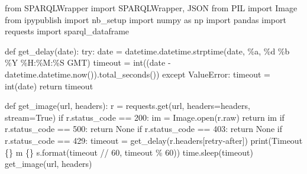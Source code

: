 \documentclass[
  letterpaper,
  DIV=11,
  numbers=noendperiod]{scrreprt}
\newenvironment{Shaded}{\begin{snugshade}}{\end{snugshade}}
\newcommand{\BuiltInTok}[1]{\textcolor[rgb]{0.00,0.23,0.31}{#1}}
\newcommand{\ControlFlowTok}[1]{\textcolor[rgb]{0.00,0.23,0.31}{#1}}
\newcommand{\DecValTok}[1]{\textcolor[rgb]{0.68,0.00,0.00}{#1}}
\newcommand{\ImportTok}[1]{\textcolor[rgb]{0.00,0.46,0.62}{#1}}
\newcommand{\KeywordTok}[1]{\textcolor[rgb]{0.00,0.23,0.31}{#1}}
\newcommand{\NormalTok}[1]{\textcolor[rgb]{0.00,0.23,0.31}{#1}}
\newcommand{\OperatorTok}[1]{\textcolor[rgb]{0.37,0.37,0.37}{#1}}
\newcommand{\PreprocessorTok}[1]{\textcolor[rgb]{0.68,0.00,0.00}{#1}}
\newcommand{\SpecialCharTok}[1]{\textcolor[rgb]{0.37,0.37,0.37}{#1}}
\newcommand{\StringTok}[1]{\textcolor[rgb]{0.13,0.47,0.30}{#1}}
\newcommand{\VariableTok}[1]{\textcolor[rgb]{0.07,0.07,0.07}{#1}}
\begin{document}
\begin{Shaded}
\begin{Highlighting}[]
\ImportTok{from}\NormalTok{ SPARQLWrapper }\ImportTok{import}\NormalTok{ SPARQLWrapper, JSON}
\ImportTok{from}\NormalTok{ PIL }\ImportTok{import}\NormalTok{ Image}
\ImportTok{from}\NormalTok{ ipypublish }\ImportTok{import}\NormalTok{ nb\_setup}
\ImportTok{import}\NormalTok{ numpy }\ImportTok{as}\NormalTok{ np}
\ImportTok{import}\NormalTok{ pandas}
\ImportTok{import}\NormalTok{ requests}
\ImportTok{import}\NormalTok{ sparql\_dataframe}

\KeywordTok{def}\NormalTok{ get\_delay(date):}
    \ControlFlowTok{try}\NormalTok{:}
\NormalTok{        date }\OperatorTok{=}\NormalTok{ datetime.datetime.strptime(date, }\StringTok{\textquotesingle{}\%a, }\SpecialCharTok{\%d}\StringTok{ \%b \%Y \%H:\%M:\%S GMT\textquotesingle{}}\NormalTok{)}
\NormalTok{        timeout }\OperatorTok{=} \BuiltInTok{int}\NormalTok{((date }\OperatorTok{{-}}\NormalTok{ datetime.datetime.now()).total\_seconds())}
    \ControlFlowTok{except} \PreprocessorTok{ValueError}\NormalTok{:}
\NormalTok{        timeout }\OperatorTok{=} \BuiltInTok{int}\NormalTok{(date)}
    \ControlFlowTok{return}\NormalTok{ timeout}

\KeywordTok{def}\NormalTok{ get\_image(url, headers):}
\NormalTok{    r }\OperatorTok{=}\NormalTok{ requests.get(url, headers}\OperatorTok{=}\NormalTok{headers, stream}\OperatorTok{=}\VariableTok{True}\NormalTok{)}
    \ControlFlowTok{if}\NormalTok{ r.status\_code }\OperatorTok{==} \DecValTok{200}\NormalTok{:}
\NormalTok{        im }\OperatorTok{=}\NormalTok{ Image.}\BuiltInTok{open}\NormalTok{(r.raw)}
        \ControlFlowTok{return}\NormalTok{ im}
    \ControlFlowTok{if}\NormalTok{ r.status\_code }\OperatorTok{==} \DecValTok{500}\NormalTok{:}
        \ControlFlowTok{return} \VariableTok{None}
    \ControlFlowTok{if}\NormalTok{ r.status\_code }\OperatorTok{==} \DecValTok{403}\NormalTok{:}
        \ControlFlowTok{return} \VariableTok{None}
    \ControlFlowTok{if}\NormalTok{ r.status\_code }\OperatorTok{==} \DecValTok{429}\NormalTok{:}
\NormalTok{        timeout }\OperatorTok{=}\NormalTok{ get\_delay(r.headers[}\StringTok{\textquotesingle{}retry{-}after\textquotesingle{}}\NormalTok{])}
        \BuiltInTok{print}\NormalTok{(}\StringTok{\textquotesingle{}Timeout }\SpecialCharTok{\{\}}\StringTok{ m }\SpecialCharTok{\{\}}\StringTok{ s\textquotesingle{}}\NormalTok{.}\BuiltInTok{format}\NormalTok{(timeout }\OperatorTok{//} \DecValTok{60}\NormalTok{, timeout }\OperatorTok{\%} \DecValTok{60}\NormalTok{))}
\NormalTok{        time.sleep(timeout)}
\NormalTok{        get\_image(url, headers)}


\end{Highlighting}
\end{Shaded}
\end{document}
